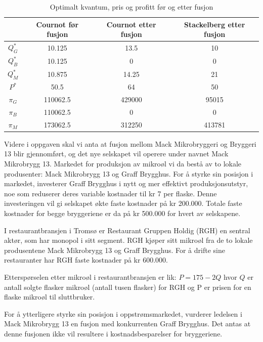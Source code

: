 \documentclass[
  12pt,
  a4paper,
  DIV=11,
  numbers=noendperiod]{scrartcl}
\begin{document}
\begin{table}[H]
\centering
\begin{tabular}{|c|c|c|c|}
\hline
\rowcolor{winered}
 & Cournot før fusjon & Cournot etter fusjon & Stackelberg etter fusjon \\ \hline
 \rowcolor{wesgrey}
$Q_G^*$ & 10.125 & 13.5 & 10 \\ \hline
 \rowcolor{wesgrey}
$Q_B^*$ & 10.125 & 0 & 0 \\ \hline
 \rowcolor{wesgrey}
$Q_M^*$ & 10.875 & 14.25 & 21 \\ \hline
 \rowcolor{wesgrey}
$P^*$ & 50.5 & 64 & 50 \\ \hline
 \rowcolor{wesgrey}
$\pi_G$ & 110062.5 & 429000 & 95015 \\ \hline
 \rowcolor{wesgrey}
$\pi_B$ & 110062.5 & 0 & 0 \\ \hline
 \rowcolor{wesgrey}
$\pi_M$ & 173062.5 & 312250 & 413781 \\ \hline
\end{tabular}
\caption{Optimalt kvantum, pris og profitt før og etter fusjon}
\label{table:fusjon}
\end{table}

Videre i oppgaven skal vi anta at fusjon mellom Mack Mikrobryggeri og
Bryggeri 13 blir gjennomført, og det nye selskapet vil operere under
navnet Mack Mikrobrygg 13. Markedet for produksjon av mikroøl vi da
bestå av to lokale produsenter: Mack Mikrobrygg 13 og Graff Brygghus.
For å styrke sin posisjon i markedet, investerer Graff Brygghus i nytt
og mer effektivt produksjonsutstyr, noe som reduserer deres variable
kostnader til kr 7 per flaske. Denne investeringen vil gi selskapet økte
faste kostnader på kr 200.000. Totale faste kostnader for begge
bryggeriene er da på kr 500.000 for hvert av selskapene.

I restaurantbransjen i Tromsø er Restaurant Gruppen Holdig (RGH) en
sentral aktør, som har monopol i sitt segment. RGH kjøper sitt mikroøl
fra de to lokale produsentene Mack Mikrobrygg 13 og Graff Brygghus. For
å drifte sine restauranter har RGH faste kostnader på kr 600.000.

Etterspørselen etter mikroøl i restaurantbransjen er lik:
\(P = 175 − 2Q\) hvor \(Q\) er antall solgte flasker mikroøl (antall
tusen flasker) for RGH og P er prisen for en flaske mikroøl til
sluttbruker.

For å ytterligere styrke sin posisjon i oppstrømsmarkedet, vurderer
ledelsen i Mack Mikrobrygg 13 en fusjon med konkurrenten Graff Brygghus.
Det antas at denne fusjonen ikke vil resultere i kostnadsbesparelser for
bryggeriene.
\end{document}
